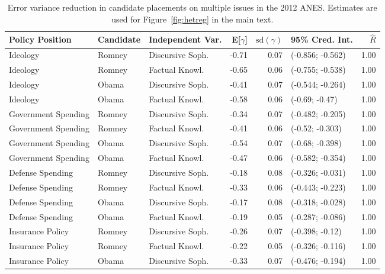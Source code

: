\begin{table}[ht]
\centering
\caption[Error variance reduction in candidate placements on multiple issues in the 2012 ANES]{Error variance reduction in candidate placements on multiple issues in the 2012 ANES. 
         Estimates are used for Figure~\ref{fig:hetreg} in the main text.} 
\label{app:hetreg2012}
\begin{tabular}{lllrrlr}
  \hline
Policy Position & Candidate & Independent Var. & E[$\gamma$] & $\text{sd}(\gamma)$ & 95\% Cred. Int. & $\hat{R}$ \\ 
  \hline
Ideology & Romney & Discursive Soph. & -0.71 & 0.07 & (-0.856; -0.562) & 1.00 \\ 
  Ideology & Romney & Factual Knowl. & -0.65 & 0.06 & (-0.755; -0.538) & 1.00 \\ 
  Ideology & Obama & Discursive Soph. & -0.41 & 0.07 & (-0.544; -0.264) & 1.00 \\ 
  Ideology & Obama & Factual Knowl. & -0.58 & 0.06 & (-0.69; -0.47) & 1.00 \\ 
  Government Spending & Romney & Discursive Soph. & -0.34 & 0.07 & (-0.482; -0.205) & 1.00 \\ 
  Government Spending & Romney & Factual Knowl. & -0.41 & 0.06 & (-0.52; -0.303) & 1.00 \\ 
  Government Spending & Obama & Discursive Soph. & -0.54 & 0.07 & (-0.68; -0.398) & 1.00 \\ 
  Government Spending & Obama & Factual Knowl. & -0.47 & 0.06 & (-0.582; -0.354) & 1.00 \\ 
  Defense Spending & Romney & Discursive Soph. & -0.18 & 0.08 & (-0.326; -0.031) & 1.00 \\ 
  Defense Spending & Romney & Factual Knowl. & -0.33 & 0.06 & (-0.443; -0.223) & 1.00 \\ 
  Defense Spending & Obama & Discursive Soph. & -0.17 & 0.08 & (-0.318; -0.028) & 1.00 \\ 
  Defense Spending & Obama & Factual Knowl. & -0.19 & 0.05 & (-0.287; -0.086) & 1.00 \\ 
  Insurance Policy & Romney & Discursive Soph. & -0.26 & 0.07 & (-0.398; -0.12) & 1.00 \\ 
  Insurance Policy & Romney & Factual Knowl. & -0.22 & 0.05 & (-0.326; -0.116) & 1.00 \\ 
  Insurance Policy & Obama & Discursive Soph. & -0.33 & 0.07 & (-0.476; -0.194) & 1.00 \\ 

\end{tabular}
\end{table}
